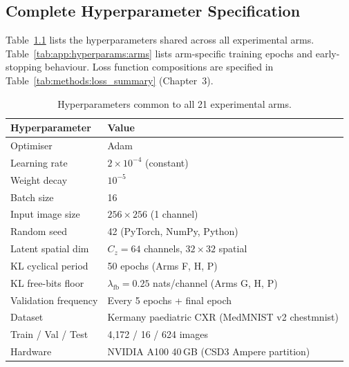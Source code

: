 \documentclass[12pt, a4paper, twoside, openright]{book}
\begin{document}
\begin{appendices}
\renewcommand{\chaptername}{Appendix}

\chapter{Complete Hyperparameter Specification}
\label{app:hyperparams}

Table~\ref{tab:app:hyperparams:shared} lists the hyperparameters shared across all experimental arms. Table~\ref{tab:app:hyperparams:arms} lists arm-specific training epochs and early-stopping behaviour. Loss function compositions are specified in Table~\ref{tab:methods:loss_summary} (Chapter~3).

\begin{table}[htbp]
\centering
\caption[Shared training hyperparameters (all arms)]{Hyperparameters common to all 21 experimental arms.}
\label{tab:app:hyperparams:shared}
\begin{tabular}{ll}
\toprule
\textbf{Hyperparameter} & \textbf{Value} \\
\midrule
Optimiser            & Adam \cite{kingma_adam_2015} \\
Learning rate        & $2 \times 10^{-4}$ (constant) \\
Weight decay         & $10^{-5}$ \\
Batch size           & 16 \\
Input image size     & $256 \times 256$ (1 channel) \\
Random seed          & 42 (PyTorch, NumPy, Python) \\
Latent spatial dim   & $C_z = 64$ channels, $32 \times 32$ spatial \\
KL cyclical period   & 50 epochs (Arms F, H, P) \\
KL free-bits floor   & $\lambda_{\mathrm{fb}} = 0.25$ nats/channel (Arms G, H, P) \\
Validation frequency & Every 5 epochs + final epoch \\
Dataset              & Kermany paediatric CXR (MedMNIST v2 chest\-mnist) \\
Train / Val / Test   & 4{,}172 / 16 / 624 images \\
Hardware             & NVIDIA A100 40\,GB (CSD3 Ampere partition) \\
\bottomrule
\end{tabular}
\end{table}


\end{appendices}
\end{document}
